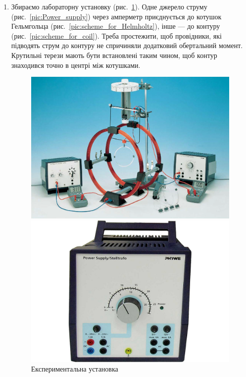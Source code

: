 \documentclass{LabWorkTemplate}
\begin{document}
\begin{enumerate}
	\item Збираємо лабораторну установку (рис.~\ref{pic:Experimental_installation}). Одне джерело струму (рис.~\ref{pic:Power_supply}) через амперметр приєднується до котушок Гельмгольца (рис.~\ref{pic:scheme_for_Helmholtz}), інше --- до контуру (рис.~\ref{pic:scheme_for_coil}). Треба простежити, щоб провідники, які підводять струм до контуру не спричиняли додатковий обертальний момент. Крутильні терези мають бути встановлені таким чином, щоб контур знаходився точно в центрі між котушками.

\begin{figure}[h!]\centering
\begin{minipage}[t]{0.47\linewidth}
\begin{tornpage}\centering
		\includegraphics[width=1\linewidth]{Experimental_installation}
		\caption{Експериментальна установка}
		\label{pic:Experimental_installation}
\end{tornpage}
\end{minipage}
\quad%
\begin{minipage}[t]{0.47\linewidth}
\begin{tornpage}\centering
		\includegraphics[width=1\linewidth]{Power_supply}

\end{tornpage}
\end{minipage}
\end{figure}
\end{enumerate}
\end{document}
